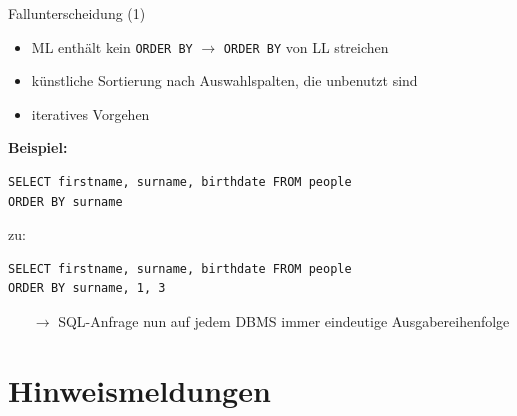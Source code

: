 \documentclass{beamer}
\begin{document}
\begin{frame}[fragile]{Fallunterscheidung (1)}
\begin{itemize}
\item ML enthält kein \verb|ORDER BY| $\to$ \verb|ORDER BY| von LL streichen
\item künstliche Sortierung nach Auswahlspalten, die unbenutzt sind
\item iteratives Vorgehen
\end{itemize}
\textbf{Beispiel:}\\
\begin{verbatim}
SELECT firstname, surname, birthdate FROM people 
ORDER BY surname
\end{verbatim}\pause
zu:
\begin{verbatim}
SELECT firstname, surname, birthdate FROM people 
ORDER BY surname, 1, 3
\end{verbatim}
\begin{itemize}
\item[$\to$] SQL-Anfrage nun auf jedem DBMS immer eindeutige Ausgabereihenfolge
\end{itemize}
\end{frame}
%
%


\section{Hinweismeldungen}
\end{document}
